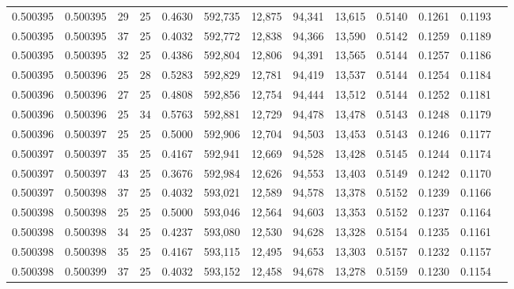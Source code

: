 \begin{tabular}{rrrrrrrrrrrrr}
0.500395 & 0.500395 &    29 &  25 &                                     0.4630 & 592,735 &  12,875 &  94,341 &  13,615 & 0.5140 & 0.1261 & 0.1193 \\
0.500395 & 0.500395 &    37 &  25 &                                     0.4032 & 592,772 &  12,838 &  94,366 &  13,590 & 0.5142 & 0.1259 & 0.1189 \\
0.500395 & 0.500395 &    32 &  25 &                                     0.4386 & 592,804 &  12,806 &  94,391 &  13,565 & 0.5144 & 0.1257 & 0.1186 \\
0.500395 & 0.500396 &    25 &  28 &                                     0.5283 & 592,829 &  12,781 &  94,419 &  13,537 & 0.5144 & 0.1254 & 0.1184 \\
0.500396 & 0.500396 &    27 &  25 &                                     0.4808 & 592,856 &  12,754 &  94,444 &  13,512 & 0.5144 & 0.1252 & 0.1181 \\
0.500396 & 0.500396 &    25 &  34 &                                     0.5763 & 592,881 &  12,729 &  94,478 &  13,478 & 0.5143 & 0.1248 & 0.1179 \\
0.500396 & 0.500397 &    25 &  25 &                                     0.5000 & 592,906 &  12,704 &  94,503 &  13,453 & 0.5143 & 0.1246 & 0.1177 \\
0.500397 & 0.500397 &    35 &  25 &                                     0.4167 & 592,941 &  12,669 &  94,528 &  13,428 & 0.5145 & 0.1244 & 0.1174 \\
0.500397 & 0.500397 &    43 &  25 &                                     0.3676 & 592,984 &  12,626 &  94,553 &  13,403 & 0.5149 & 0.1242 & 0.1170 \\
0.500397 & 0.500398 &    37 &  25 &                                     0.4032 & 593,021 &  12,589 &  94,578 &  13,378 & 0.5152 & 0.1239 & 0.1166 \\
0.500398 & 0.500398 &    25 &  25 &                                     0.5000 & 593,046 &  12,564 &  94,603 &  13,353 & 0.5152 & 0.1237 & 0.1164 \\
0.500398 & 0.500398 &    34 &  25 &                                     0.4237 & 593,080 &  12,530 &  94,628 &  13,328 & 0.5154 & 0.1235 & 0.1161 \\
0.500398 & 0.500398 &    35 &  25 &                                     0.4167 & 593,115 &  12,495 &  94,653 &  13,303 & 0.5157 & 0.1232 & 0.1157 \\
0.500398 & 0.500399 &    37 &  25 &                                     0.4032 & 593,152 &  12,458 &  94,678 &  13,278 & 0.5159 & 0.1230 & 0.1154 \\

\end{tabular}
